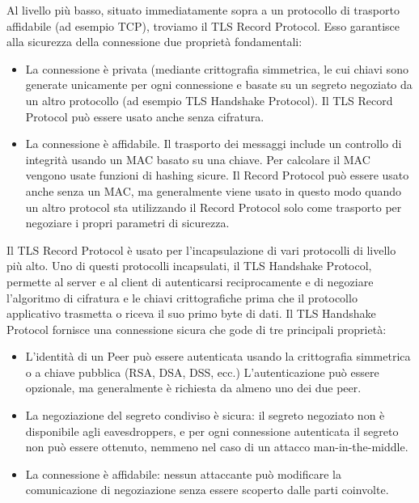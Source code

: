 Al livello più basso, situato immediatamente sopra a un protocollo di trasporto affidabile (ad esempio TCP), troviamo il TLS Record Protocol.
Esso garantisce alla sicurezza della connessione due proprietà fondamentali:
\begin{itemize}
\item La connessione è privata (mediante crittografia simmetrica, le cui chiavi sono generate unicamente per ogni connessione e basate su un segreto negoziato da un altro protocollo (ad esempio TLS Handshake Protocol).
Il TLS Record Protocol può essere usato anche senza cifratura.
\item La connessione è affidabile. Il trasporto dei messaggi include un controllo di integrità usando un MAC basato su una chiave. Per calcolare il MAC vengono usate funzioni di hashing sicure. Il Record Protocol può essere usato anche senza un MAC, ma generalmente viene usato in questo modo quando un altro protocol sta utilizzando il Record Protocol solo come trasporto per negoziare i propri parametri di sicurezza.
\end{itemize}
Il TLS Record Protocol è usato per l'incapsulazione di vari protocolli di livello più alto. Uno di questi protocolli incapsulati, il TLS Handshake Protocol, permette al server e al client di autenticarsi reciprocamente e di negoziare l'algoritmo di cifratura e le chiavi crittografiche prima che il protocollo applicativo trasmetta o riceva il suo primo byte di dati. Il TLS Handshake Protocol fornisce una connessione sicura che gode di tre principali proprietà:
\begin{itemize}
\item L'identità di un Peer può essere autenticata usando la crittografia simmetrica o a chiave pubblica (RSA, DSA, DSS, ecc.) L'autenticazione può essere opzionale, ma generalmente è richiesta da almeno uno dei due peer.
\item La negoziazione del segreto condiviso è sicura: il segreto negoziato non è disponibile agli eavesdroppers, e per ogni connessione autenticata il segreto non può essere ottenuto, nemmeno nel caso di un attacco man-in-the-middle.
\item La connessione è affidabile: nessun attaccante può modificare la comunicazione di negoziazione senza essere scoperto dalle parti coinvolte.
\end{itemize}




